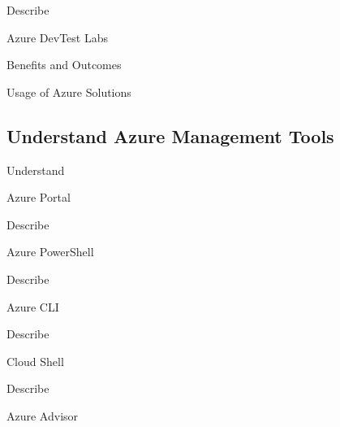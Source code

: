 \documentclass{scrartcl}
\newenvironment{flashcard}[2][]{%
    #1
    \vfill
    \centerline{\Large{#2}}
    \vfill
\newpage
}
{\newpage}
\newcommand{\subsectioncard}[1]{
    \vspace*{\stretch{1}}
    \subsection{#1}
    \vspace*{\stretch{1}}
    \pagebreak
}
\begin{document}
    \begin{flashcard}[Describe]{Azure DevTest Labs}

    \end{flashcard}

    \begin{flashcard}[Benefits and Outcomes]{Usage of Azure Solutions}

    \end{flashcard}

    \subsectioncard{Understand Azure Management Tools}

    \begin{flashcard}[Understand]{Azure Portal}

    \end{flashcard}

    \begin{flashcard}[Describe]{Azure PowerShell}

    \end{flashcard}

    \begin{flashcard}[Describe]{Azure CLI}

    \end{flashcard}

    \begin{flashcard}[Describe]{Cloud Shell}

    \end{flashcard}

    \begin{flashcard}[Describe]{Azure Advisor}

    \end{flashcard}
\end{document}
